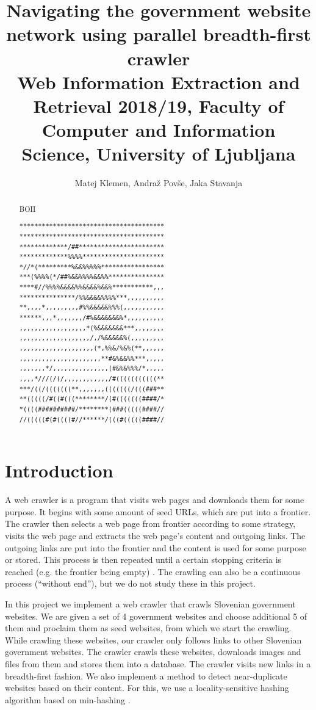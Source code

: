 \documentclass[9pt]{IEEEtran}
\title{\vspace{0ex} %
Navigating the government website network using parallel breadth-first crawler
\\ \normalsize{Web Information Extraction and Retrieval 2018/19, Faculty of Computer and Information Science, University of Ljubljana}}
\author{ %
Matej Klemen, Andraž Povše, Jaka Stavanja
\vspace{-4.0ex}
}
\begin{document}
\maketitle

\begin{abstract}
BOII
\begin{lstlisting}
***************************************
***************************************
*************/##***********************
*************%%%%**********************
*//*(*********%&&%%%%%*****************
***(%%%%(*/##%&&%%%%&&%%***************
****#//%%%%&&&&%%&&&&%&&%***********,,,
***************/%%&&&&%%%%***,,,,,,,,,,
**,,,,*,,,,,,,,,#%%&&&&&%%%(,,,,,,,,,,,
******,,,*,,,,,,,/#%&&&&&&&%*,,,,,,,,,,
,,,,,,,,,,,,,,,,,,*(%&&&&&&&***,,,,,,,,
,,,,,,,,,,,,,,,,,,,/,/%&&&&&%(,,,,,,,,,
,,,,,,,,,,,,,,,,,,,,(*,%%&/%&%(**,,,,,,
,,,,,,,,,,,,,,,,,,,,,,**#&%&&%%***,,,,,
,,,,,,,*/,,,,,,,,,,,,,,,(#&%&%%%/*,,,,,
,,,,*///(/(/,,,,,,,,,,,,/#(((((((((((**
***/((/(((((((**,,,,,,,(((((((/(((###**
**(((((/#((#(((********/(#(((((((####/*
*((((##########/********(###(((((####//
//(((((#(#((((#//******/(((#(((((####//
\end{lstlisting}
\end{abstract}

\section{Introduction}

A web crawler is a program that visits web pages and downloads them for some purpose.
It begins with some amount of seed URLs, which are put into a frontier.
The crawler then selects a web page from frontier according to some strategy, visits the web page and extracts the web page's content and outgoing links.
The outgoing links are put into the frontier and the content is used for some purpose or stored.
This process is then repeated until a certain stopping criteria is reached (e.g. the frontier being empty) \cite{Manning2008}.
The crawling can also be a continuous process (``without end''), but we do not study these in this project. 

In this project we implement a web crawler that crawls Slovenian government websites. 
We are given a set of 4 government websites and choose additional 5 of them and proclaim them as seed websites, from which we start the crawling.
While crawling these websites, our crawler only follows links to other Slovenian government websites.
The crawler crawls these websites, downloads images and files from them and stores them into a database. 
The crawler visits new links in a breadth-first fashion.
We also implement a method to detect near-duplicate websites based on their content.
For this, we use a locality-sensitive hashing algorithm based on min-hashing \cite{Gionis1999}.
\end{document}

